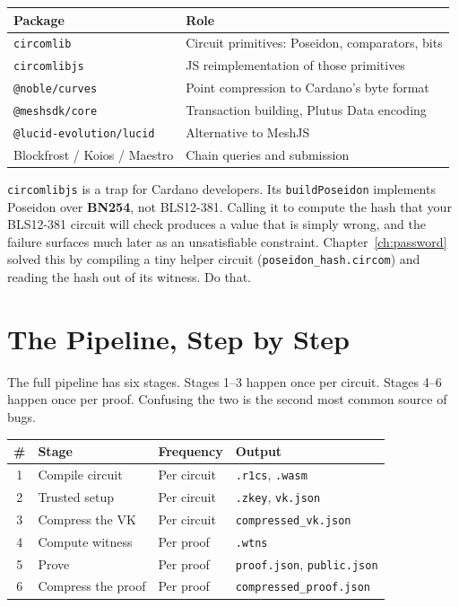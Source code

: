 \begin{center}
\begin{tabular}{ll}
  \hline
  \textbf{Package} & \textbf{Role} \\
  \hline
  \texttt{circomlib}       & Circuit primitives: Poseidon, comparators, bits \\
  \texttt{circomlibjs}     & JS reimplementation of those primitives \\
  \texttt{@noble/curves}   & Point compression to Cardano's byte format \\
  \texttt{@meshsdk/core}   & Transaction building, Plutus Data encoding \\
  \texttt{@lucid-evolution/lucid} & Alternative to MeshJS \\
  Blockfrost / Koios / Maestro & Chain queries and submission \\
  \hline
\end{tabular}
\end{center}

\begin{remark}
\texttt{circomlibjs} is a trap for Cardano developers. Its \texttt{buildPoseidon}
implements Poseidon over \textbf{BN254}, not BLS12-381. Calling it to compute the
hash that your BLS12-381 circuit will check produces a value that is simply
wrong, and the failure surfaces much later as an unsatisfiable constraint.
Chapter~\ref{ch:password} solved this by compiling a tiny helper circuit
(\texttt{poseidon\_hash.circom}) and reading the hash out of its witness.
Do that.
\end{remark}

\section{The Pipeline, Step by Step} \label{sec:ch7-pipeline}

The full pipeline has six stages. Stages 1--3 happen once per circuit. Stages
4--6 happen once per proof. Confusing the two is the second most common source
of bugs.

\begin{center}
\begin{tabular}{clll}
  \hline
  \textbf{\#} & \textbf{Stage} & \textbf{Frequency} & \textbf{Output} \\
  \hline
  1 & Compile circuit    & Per circuit & \texttt{.r1cs}, \texttt{.wasm} \\
  2 & Trusted setup      & Per circuit & \texttt{.zkey}, \texttt{vk.json} \\
  3 & Compress the VK    & Per circuit & \texttt{compressed\_vk.json} \\
  4 & Compute witness    & Per proof   & \texttt{.wtns} \\
  5 & Prove              & Per proof   & \texttt{proof.json}, \texttt{public.json} \\
  6 & Compress the proof & Per proof   & \texttt{compressed\_proof.json} \\
  \hline
\end{tabular}
\end{center}

